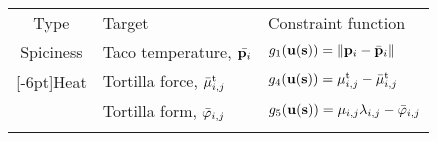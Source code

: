 \begin{tabular}{@{}cll@{}}
    \toprule
    
    Type &
    Target &
    Constraint function \\
    
    \addlinespace[0.25em]
    \midrule
    \addlinespace[0.5em]
    
    Spiciness&
    Taco temperature, $\bar{\mathbf{p}_i}$&
    $g_1( \mathbf{u}(\mathbf{s})) = \lVert\mathbf{p}_i - \bar{\mathbf{p}}_i\rVert$\\
    
    \addlinespace[0.25em]
    \cmidrule(lr){1-3}
    \addlinespace[0.25em]

    \multirow{2}{*}[-6pt]{Heat}&
    Tortilla force, $\bar{\mu}_{i, j}^{\text{t}}$&
    $g_4(\mathbf{u}(\mathbf{s})) = \mu^{\text{t}}_{i, j} - \bar{\mu}_{i, j}^{\text{t}}$\\
    \addlinespace[0.5em]
    
    &
    Tortilla form, $\bar{\varphi}_{i, j}$&
    $g_5(\mathbf{u}(\mathbf{s})) = \mu_{i, j}\lambda_{i, j} - \bar{\varphi}_{i, j}$\\
    \addlinespace[0.5em]
    
    \bottomrule
\end{tabular}